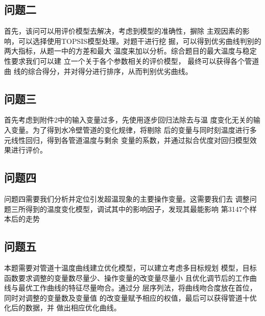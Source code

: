    \subsection{问题二}
    首先，该问可以用评价模型去解决，考虑到模型的准确性，摒除
    主观因素的影响，可以选择使用TOPSIS模型处理。对题干进行挖
    掘，可以得到优劣曲线判别的两大指标，从题一中的方差和最大
    温度来加以分析。综合题目的最大温度与稳定性要求我们可以建
    立一个关于各个参数相关的评价模型， 最终可以获得各个管道曲
    线的综合得分，并对得分进行排序，从而判别优劣曲线。
    \subsection{问题三}
    首先考虑到附件2中的输入变量过多，先使用逐步回归法除去与温
    度变化无关的输入变量。为了得到水冷壁管道的变化规律，将剔除
    后的变量与同时刻温度进行多元线性回归，得到各管道温度与剩余
    变量的系数，并通过拟合优度对回归模型效果进行评价。
    \subsection{问题四}
    问题四需要我们分析并定位引发超温现象的主要操作变量。这需要我们去
    调整问题三所得到的温度变化模型，调试其中的影响因子，发现其最能影响
    第3147个样本后的走势
    \subsection{问题五}
    本题需要对管道十温度曲线建立优化模型，可以建立考虑多目标规划
    模型，目标函数要求调整的变量数尽量少、操作变量的改变量尽量小
    且优化调节后的工作曲线与最优工作曲线的特征尽量吻合。通过分
    层序列法，将曲线吻合度放在首位，同时对调整的变量数及变量值
    的改变量赋予相应的权值，最后可以获得管道十优化后的数据，并
    做出相应优化曲线。


